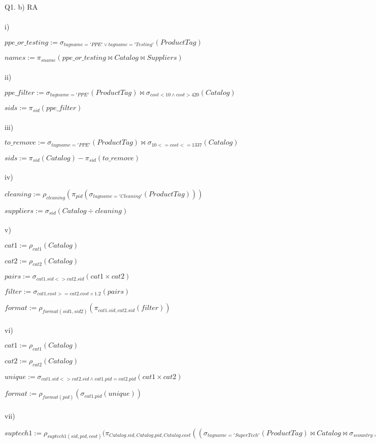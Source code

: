 \documentclass[11pt]{article}
\begin{document}
\section{ }
Q1. b) RA
\\~\\
i)

$ppe\_or\_testing := \sigma_{tagname = 'PPE' \vee tagname = 'Testing'}(ProductTag)$

$names := \pi_{sname}(ppe\_or\_testing \bowtie Catalog \bowtie Suppliers)$
\\~\\
ii)

$ppe\_filter := \sigma_{tagname = 'PPE'}(ProductTag) \bowtie \sigma_{cost < 10 \wedge cost >  420}(Catalog)$

$sids := \pi_{sid}(ppe\_filter)$
\\~\\
iii)

$to\_remove := \sigma_{tagname = 'PPE'}(ProductTag) \bowtie \sigma_{10 <= cost <= 1337}(Catalog)$

$sids := \pi_{sid}(Catalog) - \pi_{sid}(to\_remove)$
\\~\\
iv)

$cleaning := \rho_{cleaning}(\pi_{pid}(\sigma_{tagname = 'Cleaning'}(ProductTag)))$

$suppliers := \sigma_{sid}(Catalog \div cleaning)$
\\~\\
v)

$cat1 := \rho_{cat1}(Catalog)$

$cat2 := \rho_{cat2}(Catalog)$

$pairs := \sigma_{cat1.sid <> cat2.sid}(cat1 \times cat2)$

$filter := \sigma_{cat1.cost >= cat2.cost \times 1.2}(pairs)$

$format := \rho_{format(sid1, sid2)}(\pi_{cat1.sid, cat2.sid}(filter))$
\\~\\
vi)

$cat1 := \rho_{cat1}(Catalog)$

$cat2 := \rho_{cat2}(Catalog)$

$unique := \sigma_{cat1.sid <> cat2.sid \wedge cat1.pid = cat2.pid}(cat1 \times cat2)$

$format := \rho_{format(pid)}(\sigma_{cat1.pid}(unique))$
\\~\\
vii)

$suptech1 := \rho_{suptech1(sid, pid, cost)}(\pi_{Catalog.sid, Catalog.pid, Catalog.cost}((\sigma_{tagname = 'Super Tech'}(ProductTag) \bowtie Catalog \bowtie \sigma_{scountry = 'USA'}(Suppliers)))$
\end{document}
